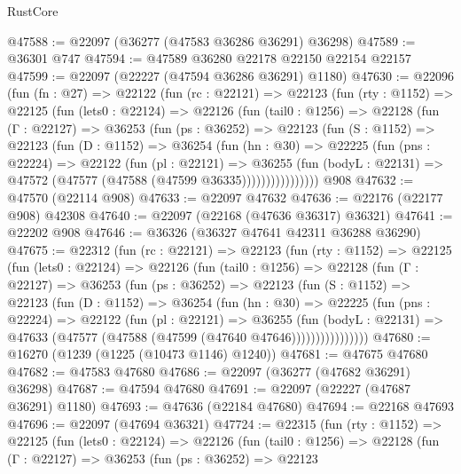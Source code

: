 \begin{lexlean}{RustCore}
\begin{coremodule}
@47588 := @22097 (@36277 (@47583 @36286 @36291) @36298)
@47589 := @36301 @747
@47594 := @47589 @36280 @22178 @22150 @22154 @22157
@47599 := @22097 (@22227 (@47594 @36286 @36291) @1180)
@47630 := @22096
    (fun (fn : @27) =>
    @22122
      (fun (rc : @22121) =>
      @22123
        (fun (rty : @1152) =>
        @22125
          (fun (lets0 : @22124) =>
          @22126
            (fun (tail0 : @1256) =>
            @22128
              (fun (Γ : @22127) =>
              @36253
                (fun (ps : @36252) =>
                @22123
                  (fun (S : @1152) =>
                  @22123
                    (fun (D : @1152) =>
                    @36254
                      (fun (hn : @30) =>
                      @22225
                        (fun (pns : @22224) =>
                        @22122
                          (fun (pl : @22121) =>
                          @36255
                            (fun (bodyL : @22131) =>
                            @47572 (@47577 (@47588 (@47599 @36335))))))))))))))))
    @908
@47632 := @47570 (@22114 @908)
@47633 := @22097 @47632
@47636 := @22176 (@22177 @908) @42308
@47640 := @22097 (@22168 (@47636 @36317) @36321)
@47641 := @22202 @908
@47646 := @36326 (@36327 @47641 @42311 @36288 @36290)
@47675 := @22312
    (fun (rc : @22121) =>
    @22123
      (fun (rty : @1152) =>
      @22125
        (fun (lets0 : @22124) =>
        @22126
          (fun (tail0 : @1256) =>
          @22128
            (fun (Γ : @22127) =>
            @36253
              (fun (ps : @36252) =>
              @22123
                (fun (S : @1152) =>
                @22123
                  (fun (D : @1152) =>
                  @36254
                    (fun (hn : @30) =>
                    @22225
                      (fun (pns : @22224) =>
                      @22122
                        (fun (pl : @22121) =>
                        @36255
                          (fun (bodyL : @22131) =>
                          @47633 (@47577 (@47588 (@47599 (@47640 @47646))))))))))))))))
@47680 := @16270 (@1239 (@1225 (@10473 @1146) @1240))
@47681 := @47675 @47680
@47682 := @47583 @47680
@47686 := @22097 (@36277 (@47682 @36291) @36298)
@47687 := @47594 @47680
@47691 := @22097 (@22227 (@47687 @36291) @1180)
@47693 := @47636 (@22184 @47680)
@47694 := @22168 @47693
@47696 := @22097 (@47694 @36321)
@47724 := @22315
    (fun (rty : @1152) =>
    @22125
      (fun (lets0 : @22124) =>
      @22126
        (fun (tail0 : @1256) =>
        @22128
          (fun (Γ : @22127) =>
          @36253
            (fun (ps : @36252) =>
            @22123

\end{coremodule}
\end{lexlean}
